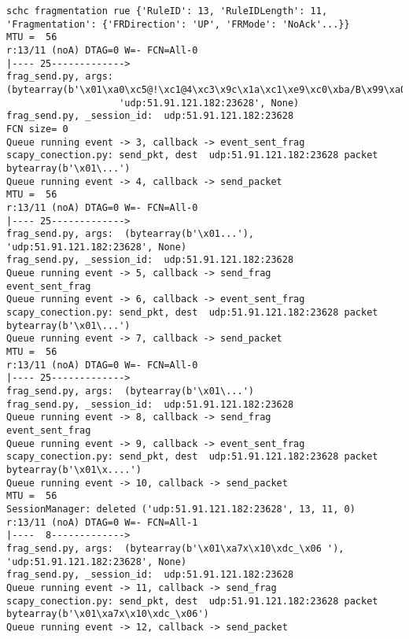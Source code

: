 \begin{lstlisting}[basicstyle=\ttfamily\tiny, numbers=none]
schc fragmentation rue {'RuleID': 13, 'RuleIDLength': 11, 'Fragmentation': {'FRDirection': 'UP', 'FRMode': 'NoAck'...}}
MTU =  56
r:13/11 (noA) DTAG=0 W=- FCN=All-0
|---- 25------------->
frag_send.py, args: (bytearray(b'\x01\xa0\xc5@!\xc1@4\xc3\x9c\x1a\xc1\xe9\xc0\xba/B\x99\xa0\x00@\x0018\x8a'), 
                    'udp:51.91.121.182:23628', None)
frag_send.py, _session_id:  udp:51.91.121.182:23628
FCN size= 0
Queue running event -> 3, callback -> event_sent_frag
scapy_conection.py: send_pkt, dest  udp:51.91.121.182:23628 packet bytearray(b'\x01\...')
Queue running event -> 4, callback -> send_packet
MTU =  56
r:13/11 (noA) DTAG=0 W=- FCN=All-0
|---- 25------------->
frag_send.py, args:  (bytearray(b'\x01...'), 'udp:51.91.121.182:23628', None)
frag_send.py, _session_id:  udp:51.91.121.182:23628
Queue running event -> 5, callback -> send_frag
event_sent_frag
Queue running event -> 6, callback -> event_sent_frag
scapy_conection.py: send_pkt, dest  udp:51.91.121.182:23628 packet bytearray(b'\x01\...')
Queue running event -> 7, callback -> send_packet
MTU =  56
r:13/11 (noA) DTAG=0 W=- FCN=All-0
|---- 25------------->
frag_send.py, args:  (bytearray(b'\x01\...')
frag_send.py, _session_id:  udp:51.91.121.182:23628
Queue running event -> 8, callback -> send_frag
event_sent_frag
Queue running event -> 9, callback -> event_sent_frag
scapy_conection.py: send_pkt, dest  udp:51.91.121.182:23628 packet bytearray(b'\x01\x....')
Queue running event -> 10, callback -> send_packet
MTU =  56
SessionManager: deleted ('udp:51.91.121.182:23628', 13, 11, 0)
r:13/11 (noA) DTAG=0 W=- FCN=All-1
|----  8------------->
frag_send.py, args:  (bytearray(b'\x01\xa7x\x10\xdc_\x06 '), 'udp:51.91.121.182:23628', None)
frag_send.py, _session_id:  udp:51.91.121.182:23628
Queue running event -> 11, callback -> send_frag
scapy_conection.py: send_pkt, dest  udp:51.91.121.182:23628 packet bytearray(b'\x01\xa7x\x10\xdc_\x06')
Queue running event -> 12, callback -> send_packet
\end{lstlisting}